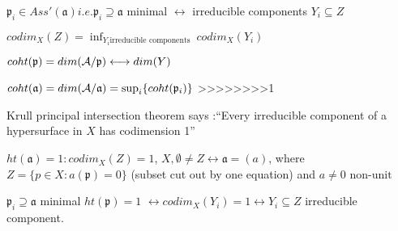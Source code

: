 \documentclass[11pt]{article}
\newcommand{\sca}{{\mathfrak a}}
\newcommand{\scp}{{\mathfrak p}}
\newcommand{\cala}{{\cal A}}
\newcommand{\llrta}{\longleftrightarrow}
\begin{document}
$\scp_i\in Ass'(\sca) i.e. \scp_i\supseteq \sca$ minimal $\llrta$ irreducible components $Y_i\subseteq Z$

$codim_X(Z)=\inf_{Y_i\text{irreducible components }} codim_X(Y_i)$

$coht(\scp)=dim(\cala/\scp)\llrta dim(Y)$

$coht(\sca)=dim(\cala/\sca)=\sup_i \{coht(\scp_i)\}$
>>>>>>>>1

Krull principal intersection theorem says :``Every irreducible component of a hypersurface in $X$ has codimension 1''

$ht(\sca)=1:codim_X(Z)=1$, $X,\emptyset\neq Z\llrta\sca=(a)$, where $Z=\{p\in X:a(\scp)=0\}$ (subset cut out by one equation) and $a\neq 0\text{ non-unit}$

$\scp_i\supseteq \sca$ minimal $ht(\scp)=1$ $\llrta codim_X(Y_i)=1\llrta Y_i\subseteq Z$ irreducible component.
\end{document}

